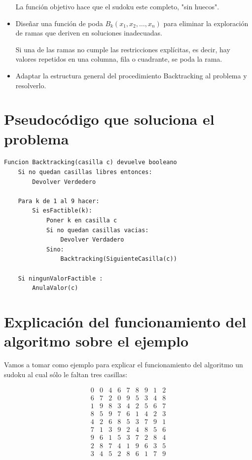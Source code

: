 \documentclass[11pt, a4paper]{article}
\theoremstyle{theorem-style}
\theoremstyle{definition-style}
\theoremstyle{remark-style}
\theoremstyle{example-style}
\begin{document}
\begin{itemize}
La función objetivo hace que el sudoku este completo, "sin huecos".


\item Diseñar una función de poda $B_k(x_1, x_2, \ldots, x_n)$ para eliminar la exploración de ramas que deriven en soluciones inadecuadas.

Si una de las ramas no cumple las restricciones explícitas, es decir, hay valores
repetidos en una columna, fila o cuadrante, se poda la rama.

\item Adaptar la estructura general del procedimiento Backtracking al problema y resolverlo.

\end{itemize}

\section{Pseudocódigo que soluciona el problema}

\begin{verbatim}
Funcion Backtracking(casilla c) devuelve booleano
    Si no quedan casillas libres entonces:
        Devolver Verdedero

    Para k de 1 al 9 hacer:
        Si esFactible(k):
            Poner k en casilla c
            Si no quedan casillas vacias:
                Devolver Verdadero
            Sino:
                Backtracking(SiguienteCasilla(c))

    Si ningunValorFactible :
        AnulaValor(c)
\end{verbatim}


\section{Explicación del funcionamiento del algoritmo sobre el ejemplo}

Vamos a tomar como ejemplo para explicar el funcionamiento del algoritmo un sudoku al cual sólo le faltan tres casillas:

\[
\begin{array}{ccccccccc}
0 & 0 & 4 & 6 & 7 & 8 & 9 & 1 & 2\\
6 & 7 & 2 & 0 & 9 & 5 & 3 & 4 & 8\\
1 & 9 & 8 & 3 & 4 & 2 & 5 & 6 & 7\\
8 & 5 & 9 & 7 & 6 & 1 & 4 & 2 & 3\\
4 & 2 & 6 & 8 & 5 & 3 & 7 & 9 & 1\\
7 & 1 & 3 & 9 & 2 & 4 & 8 & 5 & 6\\
9 & 6 & 1 & 5 & 3 & 7 & 2 & 8 & 4\\
2 & 8 & 7 & 4 & 1 & 9 & 6 & 3 & 5\\
3 & 4 & 5 & 2 & 8 & 6 & 1 & 7 & 9\\
\end{array}
\]
\end{document}

